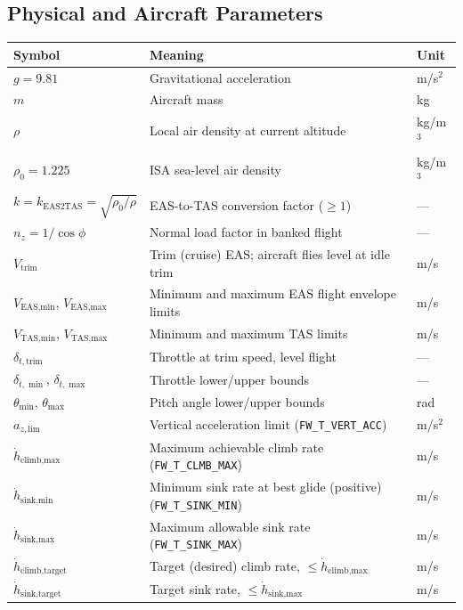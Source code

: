 \documentclass[12pt,a4paper]{article}
\begin{document}
\subsection*{Physical and Aircraft Parameters}
\begin{center}\begin{tabular}{lll}\toprule
Symbol & Meaning & Unit \\\midrule
$g = 9.81$ & Gravitational acceleration & m/s$^2$ \\
$m$ & Aircraft mass & kg \\
$\rho$ & Local air density at current altitude & kg/m$^3$ \\
$\rho_0 = 1.225$ & ISA sea-level air density & kg/m$^3$ \\
$k = k_{\text{EAS2TAS}} = \sqrt{\rho_0/\rho}$ & EAS-to-TAS conversion factor ($\geq 1$) & --- \\
$n_z = 1/\cos\phi$ & Normal load factor in banked flight & --- \\
$V_{\text{trim}}$ & Trim (cruise) EAS; aircraft flies level at idle trim & m/s \\
$V_{\text{EAS,min}}$, $V_{\text{EAS,max}}$ & Minimum and maximum EAS flight envelope limits & m/s \\
$V_{\text{TAS,min}}$, $V_{\text{TAS,max}}$ & Minimum and maximum TAS limits & m/s \\
$\delta_{t,\text{trim}}$ & Throttle at trim speed, level flight & --- \\
$\delta_{t,\min}$, $\delta_{t,\max}$ & Throttle lower/upper bounds & --- \\
$\theta_{\min}$, $\theta_{\max}$ & Pitch angle lower/upper bounds & rad \\
$a_{z,\text{lim}}$ & Vertical acceleration limit (\texttt{FW\_T\_VERT\_ACC}) & m/s$^2$ \\
$\dot{h}_{\text{climb,max}}$ & Maximum achievable climb rate (\texttt{FW\_T\_CLMB\_MAX}) & m/s \\
$\dot{h}_{\text{sink,min}}$ & Minimum sink rate at best glide (positive) (\texttt{FW\_T\_SINK\_MIN}) & m/s \\
$\dot{h}_{\text{sink,max}}$ & Maximum allowable sink rate (\texttt{FW\_T\_SINK\_MAX}) & m/s \\
$\dot{h}_{\text{climb,target}}$ & Target (desired) climb rate, $\leq\dot{h}_{\text{climb,max}}$ & m/s \\
$\dot{h}_{\text{sink,target}}$ & Target sink rate, $\leq\dot{h}_{\text{sink,max}}$ & m/s \\
\bottomrule\end{tabular}\end{center}
\end{document}
